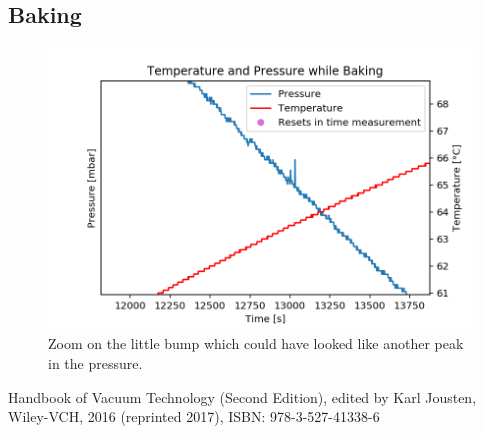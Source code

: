 \documentclass[]{article}
\begin{document}
\subsection{Baking}
\begin{figure}[!h]
\centering\includegraphics[width=.5\textwidth]{Plots/FluktuationBaking.png}
\caption{Zoom on the little bump which could have looked like another peak in the pressure.}
\label{fig::bump}
\end{figure}

\newpage
\begin{thebibliography}{9}

 Handbook of Vacuum Technology (Second Edition), edited by Karl Jousten, Wiley-VCH, 2016 (reprinted 2017), ISBN: 978-3-527-41338-6

\end{thebibliography}
\end{document}
